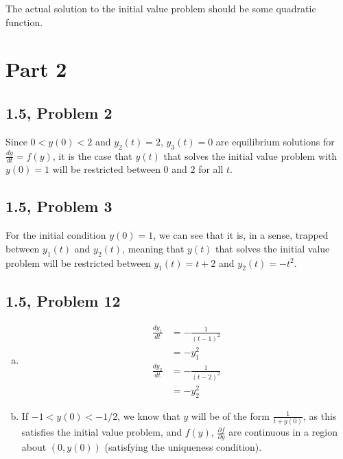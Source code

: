 \documentclass[10pt]{mypackage}
\begin{document}
The actual solution to the initial value problem should be some quadratic function.
\section{Part 2}%
\subsection{1.5, Problem 2}%
Since $0 < y(0) < 2$ and $y_2(t) = 2$, $y_3(t) = 0$ are equilibrium solutions for $\frac{dy}{dt} = f(y)$, it is the case that $y(t)$ that solves the initial value problem with $y(0) = 1$ will be restricted between $0$ and $2$ for all $t$.
\subsection{1.5, Problem 3}%
For the initial condition $y(0) = 1$, we can see that it is, in a sense, trapped between $y_1(t)$ and $y_2(t)$, meaning that $y(t)$ that solves the initial value problem will be restricted between $y_1(t) = t + 2$ and $y_2(t) = -t^2$.
\subsection{1.5, Problem 12}%
\begin{enumerate}[(a)]
  \item 
    \begin{align*}
      \frac{dy_1}{dt} &= -\frac{1}{\left(t-1\right)^2}\\
                      &= -y_1^2\\
      \frac{dy_2}{dt} &= -\frac{1}{\left(t-2\right)^2}\\
                      &= -y_2^2
    \end{align*}
  \item If $-1 < y(0) < -1/2$, we know that $y$ will be of the form $\frac{1}{t+y(0)}$, as this satisfies the initial value problem, and $f(y)$, $\frac{\partial f}{\partial y}$ are continuous in a region about $\left(0,y(0)\right)$ (satisfying the uniqueness condition).
\end{enumerate}
\end{document}
